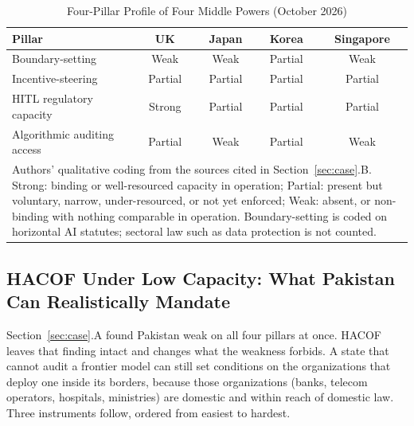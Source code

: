 \documentclass{ieeeaccess}
\newcommand{\hacof}{HACOF}
\begin{document}
\begin{table}[!t]
\caption{Four-Pillar Profile of Four Middle Powers (October 2026)}
\label{tab:middle}
\centering
\footnotesize
\setlength{\tabcolsep}{3pt}
\begin{tabular}{@{}lcccc@{}}
\toprule
\rowcolor{darkblue!15}
\textbf{Pillar} & \textbf{UK} & \textbf{Japan} & \textbf{Korea} & \textbf{Singapore} \\
\midrule
Boundary-setting & Weak & Weak & Partial & Weak \\
\rowcolor{darkblue!5}
Incentive-steering & Partial & Partial & Partial & Partial \\
HITL regulatory capacity & Strong & Partial & Partial & Partial \\
\rowcolor{darkblue!5}
Algorithmic auditing access & Partial & Weak & Partial & Weak \\
\bottomrule
\multicolumn{5}{p{8.3cm}}{\scriptsize Authors' qualitative coding from the sources cited in Section~\ref{sec:case}.B. Strong: binding or well-resourced capacity in operation; Partial: present but voluntary, narrow, under-resourced, or not yet enforced; Weak: absent, or non-binding with nothing comparable in operation. Boundary-setting is coded on horizontal AI statutes; sectoral law such as data protection is not counted.}
\end{tabular}
\end{table}

\subsection{\hacof{} Under Low Capacity: What Pakistan Can Realistically Mandate}
\label{sec:case-hacof}

Section~\ref{sec:case}.A found Pakistan weak on all four pillars at once. \hacof{} leaves that finding intact and changes what the weakness forbids. A state that cannot audit a frontier model can still set conditions on the organizations that deploy one inside its borders, because those organizations (banks, telecom operators, hospitals, ministries) are domestic and within reach of domestic law. Three instruments follow, ordered from easiest to hardest.
\end{document}
